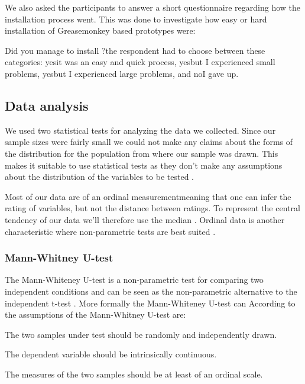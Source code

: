 We also asked the participants to answer a short questionnaire regarding
how the installation process went. This was done to investigate how easy or
hard installation of Greasemonkey based prototypes were:

\begin{items}
  \item Did you manage to install \latest{}?\dash{}the respondent had to
  choose between these categories: yes\dash{}it was an easy and quick process,
  yes\dash{}but I experienced small problems, yes\dash{}but I experienced
  large problems, and no\dash{}I gave up.
\end{items}

\subsection{Data analysis}

We used two statistical tests for analyzing the data we collected.
Since our sample sizes were fairly small we could not make any claims
about the forms of the distribution for the \urort{} population
from where our sample was drawn.
This makes it suitable to use
 statistical tests as they don't make any
assumptions about the distribution of the variables to be tested
\citep[]{siegel88}.

Most of our data are of an ordinal measurement\dash{}meaning that one can
infer the rating of variables, but not the distance between ratings.
To represent the central tendency of our data we'll therefore use the median
\citep[]{siegel88}.
Ordinal data is another characteristic where non-parametric tests
are best suited \citep[]{siegel88}.

\subsubsection{Mann-Whitney U-test}

The Mann-Whiteney U-test is a non-parametric test for comparing two
independent conditions and can be seen as the non-parametric alternative to
the independent t-test \citep[]{field05}.
More formally the Mann-Whiteney U-test can
According to \citet[]{lowry08} the assumptions of the
Mann-Whitney U-test are:

\begin{enum}
  \item The two samples under test should be randomly and independently drawn.
  \item The dependent variable should be intrinsically continuous.
  \item The measures of the two samples should be at least of an ordinal scale.
\end{enum}

